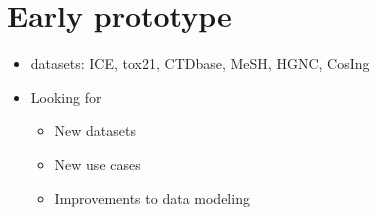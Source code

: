 \documentclass{beamer}
\def\labelenumi{\theenumi}
\begin{document}
\section{Early prototype}
\begin{frame}{\secname}
	\begin{itemize}
		\def\labelenumi{\arabic{enumi}.}
		\item datasets: ICE, tox21, CTDbase, MeSH, HGNC, CosIng
		\pause
		\item Looking for
		\begin{itemize}
			\item New datasets
			\item New use cases
			\item Improvements to data modeling
		\end{itemize}
	\end{itemize}
\end{frame}



\end{document}
